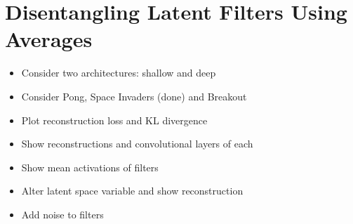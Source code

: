%
%
%
%
%
\section{Disentangling Latent Filters Using Averages}
\begin{itemize}
\item Consider two architectures: shallow and deep
\item Consider Pong, Space Invaders (done) and Breakout
\item Plot reconstruction loss and KL divergence
\item Show reconstructions and convolutional layers of each
\item Show mean activations of filters
\item Alter latent space variable and show reconstruction
\item Add noise to filters
\end{itemize}



